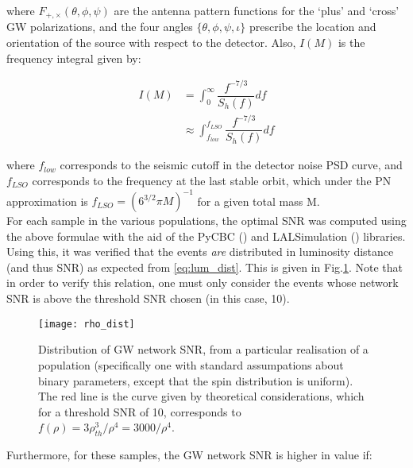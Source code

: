         where $F_{+, \times}(\theta, \phi, \psi)$ are the antenna pattern functions for
        the `plus' and `cross' GW polarizations, and the four angles $\{\theta, \phi,
        \psi, \iota\}$ prescribe the location and orientation of the source with respect
        to the detector. Also, $I(M)$ is the frequency integral given by:

        \begin{align}
                I(M) &= \int_0^\infty \dfrac{f^{-7/3}}{S_h(f)} df \\
                     &\approx \int_{f_{low}}^{f_{LSO}} \dfrac{f^{-7/3}}{S_h(f)} df
        \end{align}

        where $f_{low}$ corresponds to the seismic cutoff in the detector noise PSD
        curve, and $f_{LSO}$ corresponds to the frequency at the last stable orbit,
        which under the PN approximation is $f_{LSO} = (6^{3/2} \pi M)^{-1}$ for a given
        total mass M.\\
        For each sample in the various populations, the optimal SNR was computed using
        the above formulae with the aid of the PyCBC (\cite{pycbc}) and LALSimulation
        (\cite{lalsuite}) libraries. Using this, it was verified that the events
        \textit{are} distributed in luminosity distance (and thus SNR) as expected from
        \ref{eq:lum_dist}. This is given in Fig.\ref{fig:rho_dist}. Note that
        in order to verify this relation, one must only consider the events whose
        network SNR is above the threshold SNR chosen (in this case, 10).\\

        \begin{figure}[H]
            \centering
            \texttt{[image: rho\_dist]}
            \caption[Distribution of GW network SNR]{
                Distribution of GW network SNR, from a particular realisation of a
                population (specifically one with standard assumpations about binary
                parameters, except that the spin distribution is uniform). The red line
                is the curve given by theoretical considerations, which for a threshold
                SNR of 10, corresponds to $f(\rho) = 3\rho_{th}^3 / \rho^4 = 3000 /
                \rho^4$.
            }
            \label{fig:rho_dist}
        \end{figure}


        Furthermore, for these samples, the GW network SNR is higher in value if:

